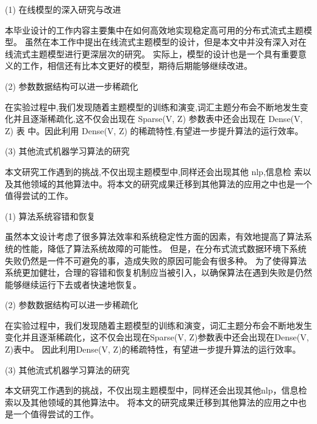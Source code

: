 (1) 在线模型的深入研究与改进 

本毕业设计的工作内容主要集中在如何高效地实现稳定高可用的分布式流式主题模型。
	虽然在本工作中提出在线流式主题模型的设计，但是本文中并没有深入对在线流式主题模型进行更深层次的研究。
	实际上，模型的设计也是一个具有重要意义的工作，相信还有比本文更好的模型，期待后期能够继续改进。

(2) 参数数据结构可以进一步稀疏化 

在实验过程中,我们发现随着主题模型的训练和演变,词汇主题分布会不断地发生变化并且逐渐稀疏化,这不仅会出现在 Sparse(V, Z) 参数表中还会出现在 Dense(V, Z) 表 中。因此利用 Dense(V, Z) 的稀疏特性,有望进一步提升算法的运行效率。 

(3) 其他流式机器学习算法的研究 

本文研究工作遇到的挑战,不仅出现主题模型中,同样还会出现其他 nlp,信息检 索以及其他领域的其他算法中。将本文的研究成果迁移到其他算法的应用之中也是一个 值得尝试的工作。

(1) 算法系统容错和恢复

虽然本文设计考虑了很多算法效率和系统稳定性方面的因素，有效地提高了算法系统的性能，降低了算法系统故障的可能性。
但是，在分布式流式数据环境下系统失败仍然是一件不可避免的事，造成失败的原因可能会有很多种。
为了使得算法系统更加健壮，合理的容错和恢复机制应当被引入，以确保算法在遇到失败是仍然能够继续运行下去或者快速地恢复。

(2) 参数数据结构可以进一步稀疏化

在实验过程中，我们发现随着主题模型的训练和演变，词汇主题分布会不断地发生变化并且逐渐稀疏化，这不仅会出现在Sparse(V, Z)参数表中还会出现在Dense(V, Z)表中。
因此利用Dense(V, Z)的稀疏特性，有望进一步提升算法的运行效率。


(3) 其他流式机器学习算法的研究

本文研究工作遇到的挑战，不仅出现主题模型中，同样还会出现其他nlp，信息检索以及其他领域的其他算法中。
将本文的研究成果迁移到其他算法的应用之中也是一个值得尝试的工作。
